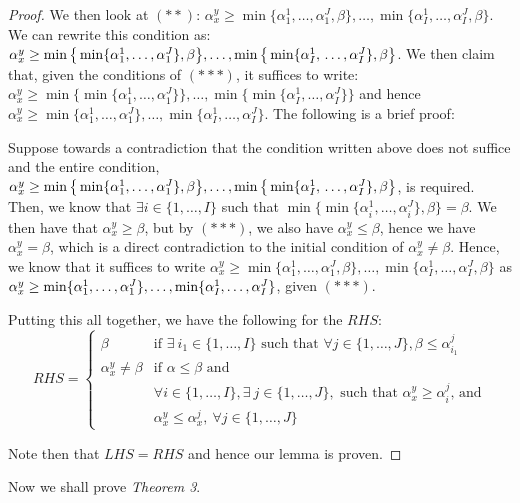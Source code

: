\documentclass{article} %
\begin{document}
\begin{proof}
We then look at $(**)$: $\alpha_x^y\geq \min\{\alpha_1^1,\ldots,\alpha_1^J,\beta\},\ldots,\min\{\alpha_I^1,\ldots,\alpha_I^J,\beta\}$. We can rewrite this condition as: $\alpha_x^y\geq \min\big\{\min\{\alpha_1^1,\ldots,\alpha_1^J\},\beta\big\},\ldots,\min\big\{\min\{\alpha_I^1,\\\ldots,\alpha_I^J\},\beta\big\}$. We then claim that, given the conditions of $(***)$, it suffices to write: $\alpha_x^y\geq \min\big\{\min\{\alpha_1^1,\ldots,\alpha_1^J\}\big\},\ldots,\min\big\{\min\{\alpha_I^1,\ldots,\alpha_I^J\}\big\}$ and hence $\alpha_x^y\geq \min\{\alpha_1^1,\ldots,\alpha_1^J\},\ldots,\min\{\alpha_I^1,\ldots,\alpha_I^J\}$. The following is a brief proof:

Suppose towards a contradiction that the condition written above does not suffice and the entire condition, $\alpha_x^y\geq \min\big\{\min\{\alpha_1^1,\ldots,\alpha_1^J\},\beta\big\},\ldots,\min\big\{\min\{\alpha_I^1,\\\ldots,\alpha_I^J\},\beta\big\}$, is required. Then, we know that $\exists i\in\{1,\ldots,I\}$ such that $\min\big\{\min\{\alpha_i^1,\ldots,\alpha_i^J\},\beta\big\}=\beta$. We then have that $\alpha_x^y\geq\beta$, but by $(***)$, we also have $\alpha_x^y\leq\beta$, hence we have $\alpha_x^y=\beta$, which is a direct contradiction to the initial condition of $\alpha_x^y\not=\beta$. Hence, we know that it suffices to write $\alpha_x^y\geq \min\{\alpha_1^1,\ldots,\alpha_1^J,\beta\},\ldots,\min\{\alpha_I^1,\ldots,\alpha_I^J,\beta\}$ as $\alpha_x^y\geq \min\{\alpha_1^1,\ldots,\alpha_1^J\},\ldots,\min\{\\ \alpha_I^1,\ldots,\alpha_I^J\}$, given $(***)$.

Putting this all together, we have the following for the $RHS$:
\[
RHS=
\begin{cases}
\beta & \textrm{if }\exists\ i_1\in\{1,\ldots,I\} \textrm{ such that }\forall j\in\{1,\ldots,J\}, \beta\leq\alpha_{i_1}^j \\
\alpha_x^y\not=\beta & \textrm{if } \alpha\leq\beta \textrm{ and}\\
& \forall i\in\{1,\ldots,I\}, \exists\ j\in\{1,\ldots,J\}, \textrm{ such that } \alpha_x^y\geq\alpha_i^j \textrm{, and}\\
& \alpha_x^y\leq\alpha_x^j,\ \forall j\in\{1,\ldots,J\}
\end{cases}
\]

Note then that $LHS=RHS$ and hence our lemma is proven.
\end{proof}

Now we shall prove \textit{Theorem 3}.
\end{document}
